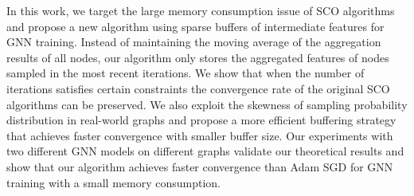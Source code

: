 In this work, we target the large memory consumption issue of SCO algorithms and propose a new algorithm using sparse buffers of intermediate features for GNN training. 
Instead of maintaining the moving average of the aggregation results of all nodes, our algorithm only stores the aggregated features of nodes sampled in the most recent iterations. 
We show that when the number of iterations satisfies certain constraints the convergence rate of the original SCO algorithms can be preserved. 
We also exploit the skewness of sampling probability distribution in real-world graphs and propose a more efficient buffering strategy that achieves faster convergence with smaller buffer size. 
Our experiments with two different GNN models on different graphs validate our theoretical results and show that our algorithm achieves faster convergence than Adam SGD for GNN training with a small memory consumption. 




















